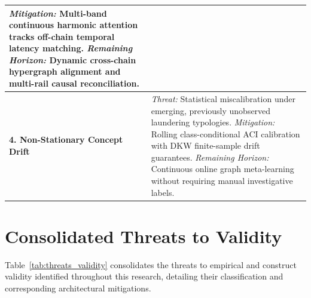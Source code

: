\begin{table}[htbp]
{\begin{tabular}{>{\bfseries}l >{\RaggedRight}p{11.5cm}}
\textit{Mitigation:} Multi-band continuous harmonic attention tracks off-chain temporal latency matching. \newline
\textit{Remaining Horizon:} Dynamic cross-chain hypergraph alignment and multi-rail causal reconciliation. \\
\midrule
4. Non-Stationary Concept Drift & \textit{Threat:} Statistical miscalibration under emerging, previously unobserved laundering typologies. \newline
\textit{Mitigation:} Rolling class-conditional ACI calibration with DKW finite-sample drift guarantees. \newline
\textit{Remaining Horizon:} Continuous online graph meta-learning without requiring manual investigative labels. \\
\bottomrule
\end{tabular}%
}
\end{table}

\section{Consolidated Threats to Validity}
Table~\ref{tab:threats_validity} consolidates the threats to empirical and construct validity identified throughout this research, detailing their classification and corresponding architectural mitigations.

